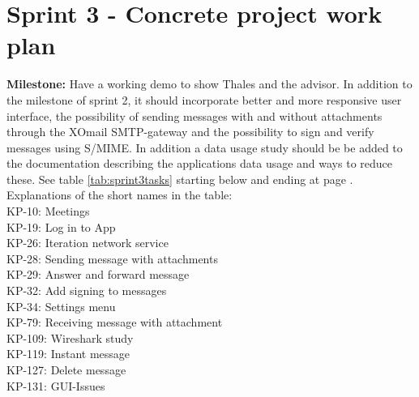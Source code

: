 \section{Sprint 3 - Concrete project work plan}

\textbf{Milestone:} Have a working demo to show Thales and the advisor. In addition to the milestone of sprint 2, it should incorporate better and more responsive user interface, the possibility of sending messages with and without attachments through the XOmail SMTP-gateway and the possibility to sign and verify messages using S/MIME. In addition a data usage study should be be added to the documentation describing the applications data usage and ways to reduce these.
\newline
\newline
See table \ref{tab:sprint3tasks} starting below and ending at page \pageref{tab:sprint3tasks}.
\newline
\newline
Explanations of the short names in the table:\\
KP-10: Meetings\\
KP-19: Log in to App\\
KP-26: Iteration network service\\
KP-28: Sending message with attachments\\
KP-29: Answer and forward message\\
KP-32: Add signing to messages\\
KP-34: Settings menu\\
KP-79: Receiving message with attachment\\
KP-109: Wireshark study\\
KP-119: Instant message\\
KP-127: Delete message\\
KP-131: GUI-Issues\\



